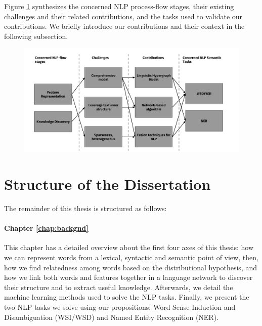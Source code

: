 
Figure \ref{fig:challenges_contribs} synthesizes the concerned NLP process-flow stages, their existing challenges and their related contributions, and the tasks used to validate our contributions. We briefly introduce our contributions and their context in the following subsection.

\begin{figure}
\centering
\includegraphics[width=1\linewidth]{./images/Chapitre1/challenges_contribs.pdf}
\caption{}
\label{fig:challenges_contribs}
\end{figure}
\section{Structure of the Dissertation}
The remainder of this thesis is structured as follows:
\paragraph{Chapter \ref{chap:backgnd}} This chapter has a detailed overview about the first four axes of this thesis: how we can represent words from a lexical, syntactic and semantic point of view, then, how we find relatedness among words based on  the distributional hypothesis, and how we link both words and features together in a language network to discover their structure and to extract useful knowledge. 
%
Afterwards, we detail the machine learning methods used to solve the NLP tasks. Finally, we present the two NLP tasks we solve using our propositions: Word Sense Induction and Disambiguation (WSI/WSD) and Named Entity Recognition (NER).
